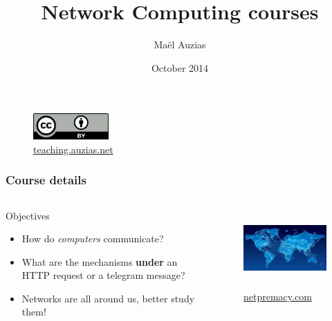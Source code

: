 \documentclass{beamer}
\title{Network Computing courses}
\author{Maël Auzias}
\institute{ENSIBS - UBS}
\date{October 2014}
\begin{document}
\begin{frame}
  \titlepage
  \begin{figure}[p]
      \centering
      \includegraphics[height=1cm]{./imgs/cc40.jpg}
      \caption{\color{blue}\href{http://teaching.auzias.net}{teaching.auzias.net}}
    \label{fig:cc40}
  \end{figure}
\end{frame}


  \begin{frame}
    \frametitle{Course details}
    \begin{columns}
	\begin{block}{Objectives}
	  \begin{itemize}
	    \item How do \emph{computers} communicate?
	    \item What are the mechanisms \textbf{under} an HTTP request or a telegram message?
	    \item Networks are all around us, better study them!
	  \end{itemize}
	\end{block}
	\begin{figure}[t]
	  \centering
	  \includegraphics[height=3cm]{./imgs/ntwks.jpeg}
	  \caption{\color{blue}\href{http://www.netpremacy.com}{netpremacy.com}}
	  \label{fig:ntwks}
	\end{figure}
    \end{columns}
  \end{frame}
\end{document}

